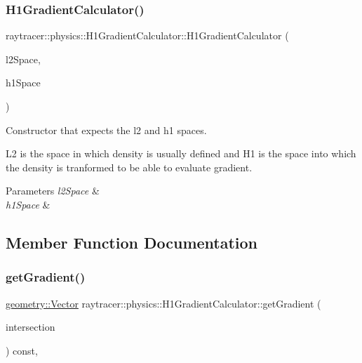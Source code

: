 \subsubsection{\texorpdfstring{H1\+Gradient\+Calculator()}{H1GradientCalculator()}}
{\footnotesize\ttfamily raytracer\+::physics\+::\+H1\+Gradient\+Calculator\+::\+H1\+Gradient\+Calculator (\begin{DoxyParamCaption}\item[{mfem\+::\+Finite\+Element\+Space \&}]{l2\+Space,  }\item[{mfem\+::\+Finite\+Element\+Space \&}]{h1\+Space }\end{DoxyParamCaption})}



Constructor that expects the l2 and h1 spaces. 

L2 is the space in which density is usually defined and H1 is the space into which the density is tranformed to be able to evaluate gradient. 
\begin{DoxyParams}{Parameters}
{\em l2\+Space} & \\
\hline
{\em h1\+Space} & \\
\hline
\end{DoxyParams}


\subsection{Member Function Documentation}
\mbox{\label{classraytracer_1_1physics_1_1H1GradientCalculator_ad1a1647e254efdafb87421d007ca6eb1}} 
\subsubsection{\texorpdfstring{get\+Gradient()}{getGradient()}}
{\footnotesize\ttfamily \hyperlink{classraytracer_1_1geometry_1_1Vector}{geometry\+::\+Vector} raytracer\+::physics\+::\+H1\+Gradient\+Calculator\+::get\+Gradient (\begin{DoxyParamCaption}\item[{const \hyperlink{structraytracer_1_1geometry_1_1Intersection}{geometry\+::\+Intersection} \&}]{intersection }\end{DoxyParamCaption}) const\hspace{0.3cm}{\ttfamily [override]}, {\ttfamily [virtual]}}



